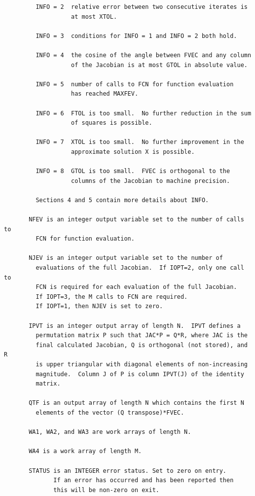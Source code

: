 \documentclass[11pt,twoside]{article}
\begin{document}
\begin{verbatim}
         INFO = 2  relative error between two consecutive iterates is
                   at most XTOL.

         INFO = 3  conditions for INFO = 1 and INFO = 2 both hold.

         INFO = 4  the cosine of the angle between FVEC and any column
                   of the Jacobian is at most GTOL in absolute value.

         INFO = 5  number of calls to FCN for function evaluation
                   has reached MAXFEV.

         INFO = 6  FTOL is too small.  No further reduction in the sum
                   of squares is possible.

         INFO = 7  XTOL is too small.  No further improvement in the
                   approximate solution X is possible.

         INFO = 8  GTOL is too small.  FVEC is orthogonal to the
                   columns of the Jacobian to machine precision.

         Sections 4 and 5 contain more details about INFO.

       NFEV is an integer output variable set to the number of calls to
         FCN for function evaluation.

       NJEV is an integer output variable set to the number of
         evaluations of the full Jacobian.  If IOPT=2, only one call to
         FCN is required for each evaluation of the full Jacobian.
         If IOPT=3, the M calls to FCN are required.
         If IOPT=1, then NJEV is set to zero.

       IPVT is an integer output array of length N.  IPVT defines a
         permutation matrix P such that JAC*P = Q*R, where JAC is the
         final calculated Jacobian, Q is orthogonal (not stored), and R
         is upper triangular with diagonal elements of non-increasing
         magnitude.  Column J of P is column IPVT(J) of the identity
         matrix.

       QTF is an output array of length N which contains the first N
         elements of the vector (Q transpose)*FVEC.

       WA1, WA2, and WA3 are work arrays of length N.

       WA4 is a work array of length M.

       STATUS is an INTEGER error status. Set to zero on entry.
              If an error has occurred and has been reported then
              this will be non-zero on exit.


\end{verbatim}
\end{document}
